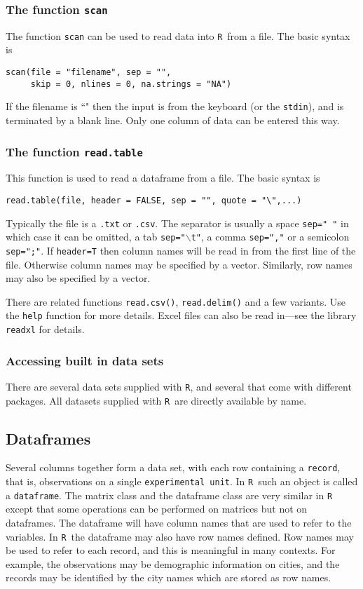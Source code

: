 \documentclass[12pt,A4,makeidx]{article}\usepackage[]{graphicx}\usepackage[]{xcolor}
\newcommand{\tR}{\texttt{R}}
\begin{document}
\subsubsection{The function \texttt{scan}}
The function \texttt{scan} can be used to read data into \tR\ from a file.
The basic syntax is

\begin{verbatim}
scan(file = "filename", sep = "",
     skip = 0, nlines = 0, na.strings = "NA")
\end{verbatim}
If the filename is ``" then the input is from the keyboard (or the \texttt{stdin}), and is 
terminated by a blank line. Only one column of data can be entered this way.


\subsubsection{The function \texttt{read.table}}
This function is used to read a dataframe from a file. The basic syntax is
\begin{verbatim}
read.table(file, header = FALSE, sep = "", quote = "\",...)
\end{verbatim}
Typically the file is a \texttt{.txt} or \texttt{.csv}. The separator is usually a space \texttt{sep=" "} in which
case it can be omitted, a tab \texttt{sep="$\backslash$t"}, a comma \texttt{sep=","} or a semicolon \texttt{sep=";"}. If 
\texttt{header=T} then column names will be read in from the first line of the file. Otherwise column names
may be specified by a vector. Similarly, row names may also be specified by a vector.


There are related functions \texttt{read.csv()}, \texttt{read.delim()} and a few variants. 
Use the \texttt{help} function for more details. Excel files can also be read in---see the library 
\texttt{readxl} for details.

\subsubsection{Accessing built in data sets}

There are several data sets supplied with \tR, and several that come with different packages. 
All datasets supplied with \tR\ are directly available by name. 

\subsection{Dataframes}
Several columns together form a data set, with each
row containing a \texttt{record}, that is, observations on a single \texttt{experimental unit}. In \tR \ such an
object is called a \texttt{dataframe}. The matrix class and the dataframe class are very similar in \tR \, except that
some operations can be performed on matrices but not on dataframes. The dataframe will have column names 
that are used to refer to the variables.
In \tR \ the dataframe may also have row names defined. Row names may be used to refer to each record,
and this is meaningful in many contexts. For example, the observations may be demographic information on cities,
and the records may be identified by the city names which are stored as row names.
\end{document}

